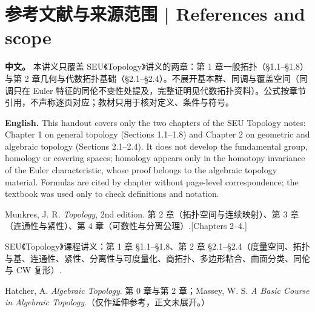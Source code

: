 \documentclass[UTF8,11pt,a4paper]{ctexart}
\newcommand{\APS}[2]{\par\noindent\textbf{中文。} #1\par\noindent\textbf{English.} #2\par\smallskip}
\begin{document}
\section*{参考文献与来源范围 | References and scope}
\APS{本讲义只覆盖 SEU《Topology》讲义的两章：第 1 章一般拓扑（§1.1--§1.8）与第 2 章几何与代数拓扑基础（§2.1--§2.4）。不展开基本群、同调与覆盖空间（同调只在 Euler 特征的同伦不变性处提及，完整证明见代数拓扑资料）。公式按章节引用，不声称逐页对应；教材只用于核对定义、条件与符号。}{This handout covers only the two chapters of the SEU Topology notes: Chapter 1 on general topology (Sections 1.1--1.8) and Chapter 2 on geometric and algebraic topology (Sections 2.1--2.4). It does not develop the fundamental group, homology or covering spaces; homology appears only in the homotopy invariance of the Euler characteristic, whose proof belongs to the algebraic topology material. Formulas are cited by chapter without page-level correspondence; the textbook was used only to check definitions and notation.}
\begin{enumerate}[label={[\arabic*]},leftmargin=2.2em,itemsep=1pt,topsep=1pt]
\item Munkres, J. R. \textit{Topology}, 2nd edition. 第 2 章（拓扑空间与连续映射）、第 3 章（连通性与紧性）、第 4 章（可数性与分离公理）.[Chapters 2--4.]
\item SEU《Topology》课程讲义：第 1 章 §1.1--§1.8、第 2 章 §2.1--§2.4（度量空间、拓扑与基、连通性、紧性、分离性与可度量化、商拓扑、多边形粘合、曲面分类、同伦与 CW 复形）.
\item Hatcher, A. \textit{Algebraic Topology}. 第 0 章与第 2 章；Massey, W. S. \textit{A Basic Course in Algebraic Topology}.（仅作延伸参考，正文未展开。）
\end{enumerate}
\end{document}
